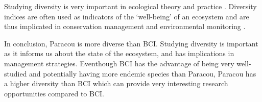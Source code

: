 \documentclass[fleqn,10pt]{ArtEcoFoG} %
\begin{document}
Studying diversity is very important in ecological theory and practice
\citep{Tothmeresz1995}. Diversity indices are often used as indicators
of the `well-being' of an ecosystem and are thus implicated in
conservation management and environmental monitoring
\citep{Tothmeresz1995, Chao2014}.

In conclusion, Paracou is more diverse than BCI. Studying diversity is
important as it informs us about the state of the ecosystem, and has
implications in management strategies. Eventhough BCI has the advantage
of being very well-studied and potentially having more endemic species
than Paracou, Paracou has a higher diversity than BCI which can provide
very interesting research opportunities compared to BCI.





\end{document}
